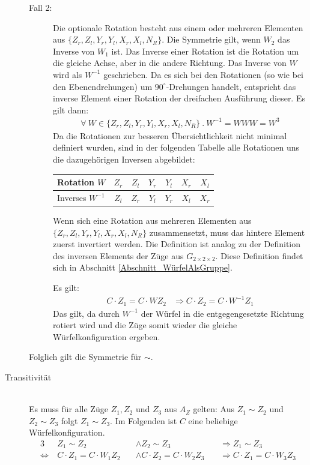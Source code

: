 \documentclass[12pt,a4paper, usenames, dvipsnames]{article}
\theoremstyle{mystyle}
\theoremstyle{definition}
\newcommand{\Gtwo}{\ensuremath{G_{2\times 2\times 2}}}
\begin{document}
\begin{description}
\begin{description}
\item[Fall 2:]
Die optionale Rotation besteht aus einem oder mehreren Elementen aus $\{{Z_r}, {Z_l}, {Y_r}, {Y_l}, {X_r}, {X_l}, N_R\}$.
Die Symmetrie gilt, wenn $W_2$ das Inverse von $W_1$ ist. Das Inverse einer Rotation ist die Rotation um die gleiche Achse, aber in die andere Richtung. 
Das Inverse von $W$ wird als $W^{-1}$ geschrieben. 
Da es sich bei den Rotationen (so wie bei den Ebenendrehungen) um $90^\circ$-Drehungen handelt, entspricht das inverse Element einer Rotation der dreifachen Ausführung dieser. 
Es gilt dann:
\begin{align*}
\forall  \ W \in \{{Z_r}, {Z_l}, {Y_r}, {Y_l}, {X_r}, {X_l}, N_R\} \ . \ W^{-1} = WWW = W^3
\end{align*}
Da die Rotationen zur besseren Übersichtlichkeit nicht minimal definiert wurden, sind in der folgenden Tabelle alle Rotationen uns die dazugehörigen Inversen abgebildet:

\begin{center}
\begin{tabular}{lcccccc}
Rotation $W$ & ${Z_r}$ & ${Z_l}$ &  ${Y_r}$ & ${Y_l}$ & ${X_r}$ & ${X_l}$  \\
\hline
Inverses \hspace*{0.1em} $W^{-1}$ & ${Z_l}$ & ${Z_r}$ &  ${Y_l}$ & ${Y_r}$ & ${X_l}$ & ${X_r}$  \\
\end{tabular} 
\end{center}


Wenn sich eine Rotation aus mehreren Elementen aus $\{{Z_r}, {Z_l}, {Y_r}, {Y_l}, {X_r}, {X_l}, N_R\}$ zusammensetzt, muss das hintere Element zuerst invertiert werden. Die Definition ist analog zu der Definition des inversen Elements der Züge aus $\Gtwo.$ Diese Definition findet sich in Abschnitt \ref{Abschnitt_WürfelAlsGruppe}.
 
Es gilt: 
\begin{align*}
C \cdot  Z_1 = C \cdot  W Z_2 & \Rightarrow C \cdot  Z_2 = C \cdot  W^{-1} Z_1
\end{align*}
Das gilt, da durch $W^{-1}$ der Würfel in die entgegengesetzte Richtung rotiert wird und die Züge somit wieder die gleiche Würfelkonfiguration ergeben.

\end{description}

Folglich gilt die Symmetrie für $\sim$.


\item [Transitivität] \ \\
Es muss für alle Züge $Z_1, Z_2$ und $Z_3$ aus $A_Z$ gelten: Aus $Z_1 \sim Z_2$ und $Z_2 \sim Z_3$ folgt $Z_1 \sim Z_3$. Im Folgenden ist $C$ eine beliebige Würfelkonfiguration.
\begin{alignat*}{3}
& Z_1 \sim Z_2 && \wedge Z_2 \sim Z_3 && \Rightarrow Z_1 \sim Z_3 \\
\Leftrightarrow \ & C \cdot  Z_1 = C \cdot  W_1Z_2 \ && \wedge C \cdot  Z_2 = C \cdot  W_2Z_3 \ && \Rightarrow C \cdot  Z_1 = C \cdot  W_3Z_3
\end{alignat*}


\end{description}
\end{document}
